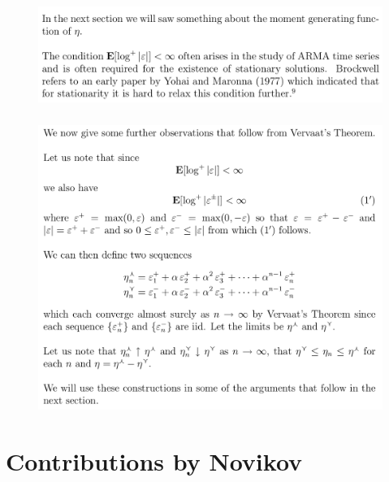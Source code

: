 \documentclass[c, dvipsnames, 8pt]{beamer}
\begin{document}
\begin{frame}[shrink=5]
	
	
	
	\frametitle{\insertsection} 
	\begin{figure}
		\centering
		\includegraphics[width=1\linewidth]{screenshot054}
		\label{fig:screenshot001}
	\end{figure}
	
	
	\frametitle{\insertsection} 
\begin{figure}
	\centering
	\includegraphics[width=1\linewidth]{screenshot055}
	\label{fig:screenshot001}
\end{figure}


	
\end{frame}



\section{Contributions by Novikov}
\end{document}
